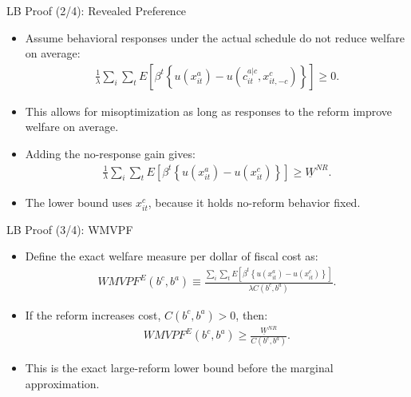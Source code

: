 \begin{frame}[label=lbProofRP]{LB Proof (2/4): Revealed Preference}
    \small
    \begin{itemize}
        \item Assume behavioral responses under the actual schedule do not reduce welfare on average:
        \begin{align*}
            \frac{1}{\lambda}\sum_i\sum_t E\left[
            \beta^t
            \left\{
            u(x^a_{it})-u(c^{a|c}_{it},x^c_{it,-c})
            \right\}
            \right]
            \ge 0.
        \end{align*}
        \item This allows for misoptimization as long as responses to the reform improve welfare on average.
        \item Adding the no-response gain gives:
        \begin{align*}
            \frac{1}{\lambda}\sum_i\sum_t E\left[
            \beta^t
            \left\{
            u(x^a_{it})-u(x^c_{it})
            \right\}
            \right]
            \ge
            \underline W^{NR}.
        \end{align*}
        \item The lower bound uses \(x^c_{it}\), because it holds no-reform behavior fixed.
    \end{itemize}
\end{frame}

\begin{frame}[label=lbProofWMVPF]{LB Proof (3/4): WMVPF}
    \small
    \begin{itemize}
        \item Define the exact welfare measure per dollar of fiscal cost as:
        \begin{align*}
            WMVPF^E(b^c,b^a)
            \equiv
            \frac{\sum_i\sum_t E\left[
            \beta^t
            \left\{
            u(x^a_{it})-u(x^c_{it})
            \right\}
            \right]}{\lambda C(b^c,b^a)}.
        \end{align*}
        \item If the reform increases cost, \(C(b^c,b^a)>0\), then:
        \begin{align*}
            WMVPF^E(b^c,b^a)
            \ge
            \frac{\underline W^{NR}}{C(b^c,b^a)}.
        \end{align*}
        \item This is the exact large-reform lower bound before the marginal approximation.
    \end{itemize}
\end{frame}

